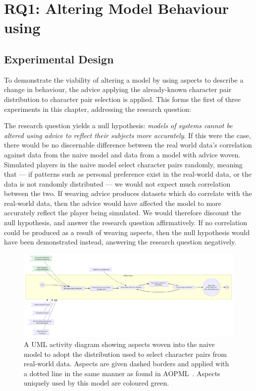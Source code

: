 \section{RQ1: Altering Model Behaviour using \AspectOrientation}
\label{sec:rq2}

\subsection{Experimental Design}

To demonstrate the viability of altering a model by using aspects to describe a
change in behaviour, the advice applying the already-known character pair
distribution to character pair selection is applied. This forms the first of
three experiments in this chapter, addressing the research question:

\begin{researchquestion}
\rqone{}
\end{researchquestion}

The research question yields a null hypothesis: \emph{models of systems cannot
be altered using advice to reflect their subjects more accurately}. If this were
the case, there would be no discernable difference between the real world data's
correlation against data from the naive model and data from a model with advice
woven. Simulated players in the naive model select character pairs randomly,
meaning that --- if patterns such as personal preference exist in the real-world
data, or the data is not randomly distributed --- we would not expect much
correlation between the two. If weaving advice produces datasets which do
correlate with the real-world data, then the advice would have affected the
model to more accurately reflect the player being simulated. We would therefore
discount the null hypothesis, and answer the research question affirmatively. If
no correlation could be produced as a result of weaving aspects, then the null
hypothesis would have been demonstrated instead, answering the research question
negatively.

\begin{figure}[h]
  \centering
  \includegraphics[width=\columnwidth]{70_generality_of_aspects/diagrams/exp2_prior_distribution_model.pdf}
  \caption{A UML activity diagram showing aspects woven into the naive model to adopt the distribution used to
  select character pairs from real-world data. Aspects are given dashed borders
  and applied with a dotted line in the same manner as found in
  AOPML~\cite{Cappelli_AOBPM}. Aspects uniquely used by this
  model are coloured green.}
  \label{fig:exp1_prior_distribution_model}
\end{figure}

